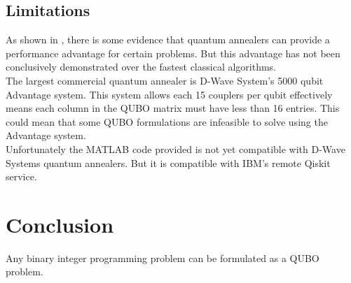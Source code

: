 \documentclass{article}
\begin{document}
\subsection{Limitations}

As shown in \cite{tasseff2022emergingpotentialquantumannealing}, there is some evidence that quantum annealers can provide a performance advantage for certain problems. But this advantage has not been conclusively demonstrated over the fastest classical algorithms.\\

\noindent The largest commercial quantum annealer is D-Wave System's 5000 qubit Advantage system. This system allows each 15 couplers per qubit effectively means each column in the QUBO matrix must have less than 16 entries. This could mean that some QUBO formulations are infeasible to solve using the Advantage system.\\

\noindent Unfortunately the MATLAB code provided is not yet compatible with D-Wave Systems quantum annealers. But it is compatible with IBM's remote Qiskit service. 

\section{Conclusion}



Any binary integer programming problem can be formulated as a QUBO problem. 

\nocite{*}
\printbibliography %
\end{document}

